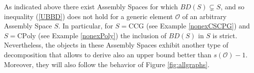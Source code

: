 \documentclass[letterpaper,12pt]{article}
\theoremstyle{definition}
\begin{document}
As indicated above there exist Assembly Spaces for which $BD(S) \subsetneq S$, and so inequality (\ref{UBBD}) does not hold for a generic element $\mathscr{O}$ of an arbitrary Assembly Space $S$. In particular, for $S=\text{CCG}$ (see Example \ref{nonexCSCPG}) and $S=\text{CPoly}$ (see Example \ref{nonexPoly}) the inclusion of $BD(S)$ in $S$ is strict. Nevertheless, the objects in these Assembly Spaces exhibit another type of decomposition that allows to derive also an upper bound better than $s(\mathscr{O})-1$. Moreover, they will also follow the behavior of Figure \ref{fig:allgraphs}.       
\end{document}
